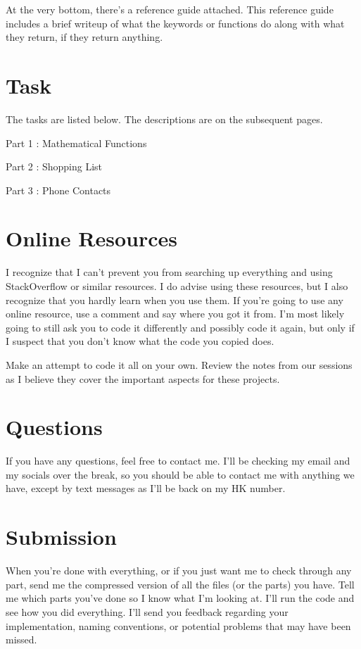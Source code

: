 \documentclass[12pt]{report}
\newcommand\tab[1][1cm]{\hspace*{#1}}
\begin{document}
At the very bottom, there's a reference guide attached. This reference guide includes a brief writeup of what the keywords or functions do along with what they return, if they return anything.

\section*{Task}

The tasks are listed below. The descriptions are on the subsequent pages.

\tab Part 1 : Mathematical Functions

\tab Part 2 : Shopping List

\tab Part 3 : Phone Contacts


\section*{Online Resources}
\hspace*{0.55cm}I recognize that I can't prevent you from searching up everything and using StackOverflow or similar resources.
I do advise using these resources, but I also recognize that you hardly learn when you use them. 
If you're going to use any online resource, use a comment and say where you got it from. 
I'm most likely going to still ask you to code it differently and possibly code it again, but only if I suspect that you don't know what the code you copied does.

Make an attempt to code it all on your own. 
Review the notes from our sessions as I believe they cover 
the important aspects for these projects. 

\section*{Questions}
If you have any questions, feel free to contact me.
I'll be checking my email and my socials over the break, 
so you should be able to contact me with anything we have, 
except by text messages as I'll be back on my HK number.

\section*{Submission}
When you're done with everything, or if you just want me to check through any part, send me the compressed version of all the files (or the parts) you have. 
Tell me which parts you've done so I know what I'm looking at.
I'll run the code and see how you did everything. I'll send you feedback regarding your implementation, naming conventions, or potential problems that may have been missed.
\end{document}
